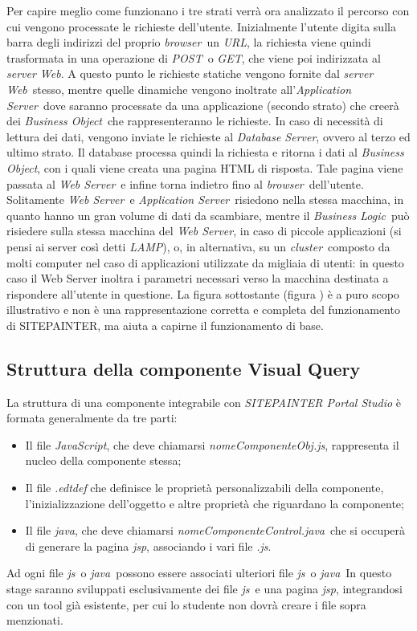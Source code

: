 Per capire meglio come funzionano i tre strati verrà ora analizzato il percorso con cui vengono processate le richieste dell'utente. Inizialmente l'utente digita sulla barra degli indirizzi del proprio \textit{browser}\ un \textit{URL}, la richiesta viene quindi trasformata in una operazione di \textit{POST}\ o \textit{GET}, che viene poi indirizzata al \textit{server Web}. A questo punto le richieste statiche vengono fornite dal \textit{server Web}\ stesso, mentre quelle dinamiche vengono inoltrate all'\textit{Application Server}\ dove saranno processate da una applicazione (secondo strato) che creerà dei \textit{Business Object}\ che rappresenteranno le richieste. In caso di necessità di lettura dei dati, vengono inviate le richieste al \textit{Database Server}, ovvero al terzo ed ultimo strato. Il database processa quindi la richiesta e ritorna i dati al \textit{Business Object}, con i quali viene creata una pagina HTML di risposta. Tale pagina viene passata al \textit{Web Server}\ e infine torna indietro fino al \textit{browser}\ dell'utente. Solitamente \textit{Web Server}\ e \textit{Application Server}\ risiedono nella stessa macchina, in quanto hanno un gran volume di dati da scambiare, mentre il \textit{Business Logic}\ può risiedere sulla stessa macchina del \textit{Web Server}, in caso di piccole applicazioni (si pensi ai server così detti \textit{LAMP}), o, in alternativa, su un \textit{cluster}\ composto da molti computer nel caso di applicazioni utilizzate da migliaia di utenti: in questo caso il Web Server inoltra i parametri necessari verso la macchina destinata a rispondere all'utente in questione.  La figura sottostante (figura ) è a puro scopo illustrativo e non è una rappresentazione corretta e completa del funzionamento di SITEPAINTER, ma aiuta a capirne il funzionamento di base.
\subsection{Struttura della componente Visual Query}
La struttura di una componente integrabile con \textit{SITEPAINTER Portal Studio} è formata generalmente
da tre parti:
\begin{itemize}
\item Il file \textit{JavaScript}, che deve chiamarsi \textit{nomeComponenteObj.js}, rappresenta il nucleo della componente stessa;
\item Il file \textit{.edtdef} che definisce le proprietà personalizzabili della componente, l'inizializzazione dell'oggetto e altre proprietà che riguardano la componente;
\item Il file \textit{java}, che deve chiamarsi \textit{nomeComponenteControl.java}\ che si occuperà di generare la pagina \textit{jsp}, associando i vari file \textit{.js}.
\end{itemize}
Ad ogni file \textit{js}\ o \textit{java}\ possono essere associati ulteriori file \textit{js}\ o \textit{java}\
In questo stage saranno sviluppati esclusivamente dei file \textit{js}\ e una pagina \textit{jsp}, integrandosi con un tool già esistente, per cui lo studente non dovrà creare i file sopra menzionati.
\newpage
